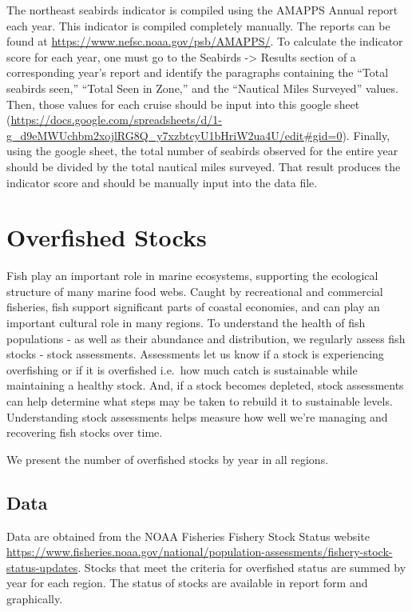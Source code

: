 \documentclass[
]{book}
\begin{document}
The northeast seabirds indicator is compiled using the AMAPPS Annual report each year. This indicator is compiled completely manually. The reports can be found at \url{https://www.nefsc.noaa.gov/psb/AMAPPS/}. To calculate the indicator score for each year, one must go to the Seabirds -\textgreater{} Results section of a corresponding year's report and identify the paragraphs containing the ``Total seabirds seen,'' ``Total Seen in Zone,'' and the ``Nautical Miles Surveyed'' values. Then, those values for each cruise should be input into this google sheet (\url{https://docs.google.com/spreadsheets/d/1-g_d9eMWUchbm2xojlRG8Q_y7xzbtcyU1bHriW2ua4U/edit\#gid=0}). Finally, using the google sheet, the total number of seabirds observed for the entire year should be divided by the total nautical miles surveyed. That result produces the indicator score and should be manually input into the data file.

\hypertarget{overfished-stocks}{%
\chapter{Overfished Stocks}\label{overfished-stocks}}

Fish play an important role in marine ecosystems, supporting the ecological structure of many marine food webs. Caught by recreational and commercial fisheries, fish support significant parts of coastal economies, and can play an important cultural role in many regions. To understand the health of fish populations - as well as their abundance and distribution, we regularly assess fish stocks - stock assessments. Assessments let us know if a stock is experiencing overfishing or if it is overfished i.e.~how much catch is sustainable while maintaining a healthy stock. And, if a stock becomes depleted, stock assessments can help determine what steps may be taken to rebuild it to sustainable levels. Understanding stock assessments helps measure how well we're managing and recovering fish stocks over time.

We present the number of overfished stocks by year in all regions.

\hypertarget{data-4}{%
\section{Data}\label{data-4}}

Data are obtained from the NOAA Fisheries Fishery Stock Status website \url{https://www.fisheries.noaa.gov/national/population-assessments/fishery-stock-status-updates}. Stocks that meet the criteria for overfished status are summed by year for each region. The status of stocks are available in report form and graphically.
\end{document}
